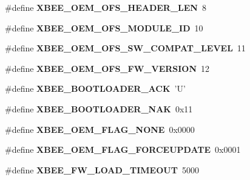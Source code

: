 \begin{DoxyCompactItemize}
\item 
\hypertarget{group__xbee__firmware_gab7cea8c88aa786bdc27e3e2a14f52278}{\#define {\bfseries X\-B\-E\-E\-\_\-\-O\-E\-M\-\_\-\-O\-F\-S\-\_\-\-H\-E\-A\-D\-E\-R\-\_\-\-L\-E\-N}~8}\label{group__xbee__firmware_gab7cea8c88aa786bdc27e3e2a14f52278}

\item 
\hypertarget{group__xbee__firmware_ga9819ebdc24e69594a3f511caa46a7ea9}{\#define {\bfseries X\-B\-E\-E\-\_\-\-O\-E\-M\-\_\-\-O\-F\-S\-\_\-\-M\-O\-D\-U\-L\-E\-\_\-\-I\-D}~10}\label{group__xbee__firmware_ga9819ebdc24e69594a3f511caa46a7ea9}

\item 
\hypertarget{group__xbee__firmware_ga36a4d3918b8dce95c49f64a66a60c940}{\#define {\bfseries X\-B\-E\-E\-\_\-\-O\-E\-M\-\_\-\-O\-F\-S\-\_\-\-S\-W\-\_\-\-C\-O\-M\-P\-A\-T\-\_\-\-L\-E\-V\-E\-L}~11}\label{group__xbee__firmware_ga36a4d3918b8dce95c49f64a66a60c940}

\item 
\hypertarget{group__xbee__firmware_ga08c3c592ffffa1278d96c33fda285b87}{\#define {\bfseries X\-B\-E\-E\-\_\-\-O\-E\-M\-\_\-\-O\-F\-S\-\_\-\-F\-W\-\_\-\-V\-E\-R\-S\-I\-O\-N}~12}\label{group__xbee__firmware_ga08c3c592ffffa1278d96c33fda285b87}

\item 
\hypertarget{group__xbee__firmware_gab7cbb4f6b1f3bb08d85a092921689c57}{\#define {\bfseries X\-B\-E\-E\-\_\-\-B\-O\-O\-T\-L\-O\-A\-D\-E\-R\-\_\-\-A\-C\-K}~'U'}\label{group__xbee__firmware_gab7cbb4f6b1f3bb08d85a092921689c57}

\item 
\hypertarget{group__xbee__firmware_ga4a6c559672de2516d8d86335f1753715}{\#define {\bfseries X\-B\-E\-E\-\_\-\-B\-O\-O\-T\-L\-O\-A\-D\-E\-R\-\_\-\-N\-A\-K}~0x11}\label{group__xbee__firmware_ga4a6c559672de2516d8d86335f1753715}

\item 
\hypertarget{group__xbee__firmware_ga01933f6abed1e3799566a284d24af8b3}{\#define {\bfseries X\-B\-E\-E\-\_\-\-O\-E\-M\-\_\-\-F\-L\-A\-G\-\_\-\-N\-O\-N\-E}~0x0000}\label{group__xbee__firmware_ga01933f6abed1e3799566a284d24af8b3}

\item 
\hypertarget{group__xbee__firmware_ga28fca9c70673cb50a5103c8685e1af36}{\#define {\bfseries X\-B\-E\-E\-\_\-\-O\-E\-M\-\_\-\-F\-L\-A\-G\-\_\-\-F\-O\-R\-C\-E\-U\-P\-D\-A\-T\-E}~0x0001}\label{group__xbee__firmware_ga28fca9c70673cb50a5103c8685e1af36}

\item 
\hypertarget{group__xbee__firmware_gab8438d198ddcd31a879433fe582a7b7c}{\#define {\bfseries X\-B\-E\-E\-\_\-\-F\-W\-\_\-\-L\-O\-A\-D\-\_\-\-T\-I\-M\-E\-O\-U\-T}~5000}\label{group__xbee__firmware_gab8438d198ddcd31a879433fe582a7b7c}


\end{DoxyCompactItemize}
